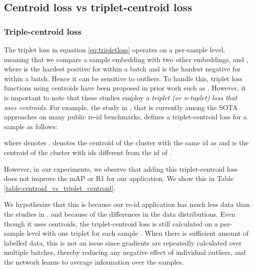 \documentclass{article}
\begin{document}
\subsection{Centroid loss vs triplet-centroid loss}



\subsubsection{Triple-centroid loss}

The triplet loss in equation \ref{eq:tripletloss} operates on a per-sample level, meaning that we compare a sample embedding  with two other embeddings,  and , where  is the hardest positive for  within a batch and  is the hardest negative for  within a batch. Hence it can be sensitive to outliers. To handle this, triplet loss functions using centroids have been proposed in prior work such as \cite{do2019theoretically, yuan2020defense, zhang2020beyond, wang2019centroid, lagunes2020centroids, wieczorek2021unreasonable, alnissany2022modified}. However, it is important to note that these studies employ a \emph{triplet (or n-tuplet) loss that uses centroids.} For example, the study in \cite{wieczorek2021unreasonable}, that is currently among the SOTA approaches on many public re-id benchmarks, defines a triplet-centroid loss for a sample  as follows:


where  denotes .  denotes the centroid of the cluster with the same id as  and  is the centroid of the cluster with ids different from the id of . 

However, in our experiments, we observe that adding this triplet-centroid loss  does not improve the mAP or R1 for our application. We show this in Table \ref{table:centroid_vs_triplet_centroid}. 

We hypothesize that this is because our re-id application has much less data than the studies in \cite{do2019theoretically, yuan2020defense, zhang2020beyond, wang2019centroid, lagunes2020centroids, wieczorek2021unreasonable, alnissany2022modified}.
and because of the differences in the data distributions. 
Even though it uses centroids, the triplet-centroid loss is still calculated on a per-sample level with one triplet for each sample . When there is sufficient amount of labelled data, this is not an issue since gradients are repeatedly calculated over multiple batches, thereby reducing any negative effect of individual outliers, and the network learns to average information over the samples.
\end{document}

